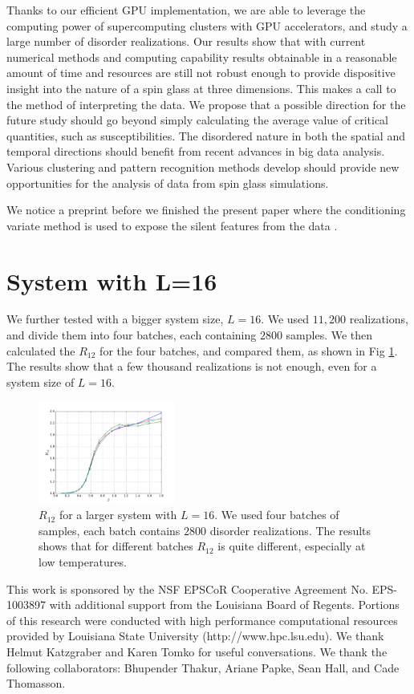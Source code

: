 \documentclass[aps,prb,twocolumn,showpacs,superscriptaddress]{revtex4}
\begin{document}
Thanks to our efficient GPU implementation, we are able to leverage the computing
power of supercomputing clusters with GPU accelerators, and study a large number of disorder
realizations. Our results show that with current numerical methods and computing capability  
results obtainable in a reasonable amount of time and resources are still not robust enough 
to provide dispositive insight into the nature of a spin glass at three dimensions. This makes a call 
to the method of interpreting the data. We propose that a possible direction for the 
future study should go beyond simply calculating the average value of critical quantities, 
such as susceptibilities. The disordered nature in both the spatial and temporal directions 
should benefit from recent advances in big data analysis. Various clustering and
pattern recognition methods develop should provide new opportunities for the
analysis of data from spin glass simulations. 

We notice a preprint before we finished the present paper where the conditioning variate method
is used to expose the silent features from the data \cite{Baity-Jesi-etal-2014}. 


\appendix
\section{System with L=16}

We further tested with a bigger system size, $L=16$. We used $11,200$ realizations,
and divide them into four batches, each containing $2800$ samples. We then calculated
the $R_{12}$ for the four batches, and compared them, as shown in Fig \ref{fig:l16_r12}. 
The results show that a few thousand realizations is not enough, even for a 
system size of $L=16$. 


\begin{figure}[ht]
  \centering
  \includegraphics[width=0.4\textwidth]{img/l16_r12.pdf}
  \caption{$R_{12}$ for a larger system with $L=16$. We used four batches of samples,
each batch contains $2800$ disorder realizations. The results shows that for
different batches $R_{12}$ is quite different, especially at low temperatures.
}
\label{fig:l16_r12}
\end{figure}


This work is sponsored by the NSF EPSCoR Cooperative Agreement No. EPS-1003897 with additional support 
from the Louisiana Board of Regents. Portions of this research were conducted with high performance computational resources provided by 
Louisiana State University (http://www.hpc.lsu.edu). We thank Helmut Katzgraber and Karen 
Tomko for useful conversations. We thank the following collaborators: Bhupender Thakur, Ariane Papke, Sean Hall, and Cade Thomasson. 


\end{document}
